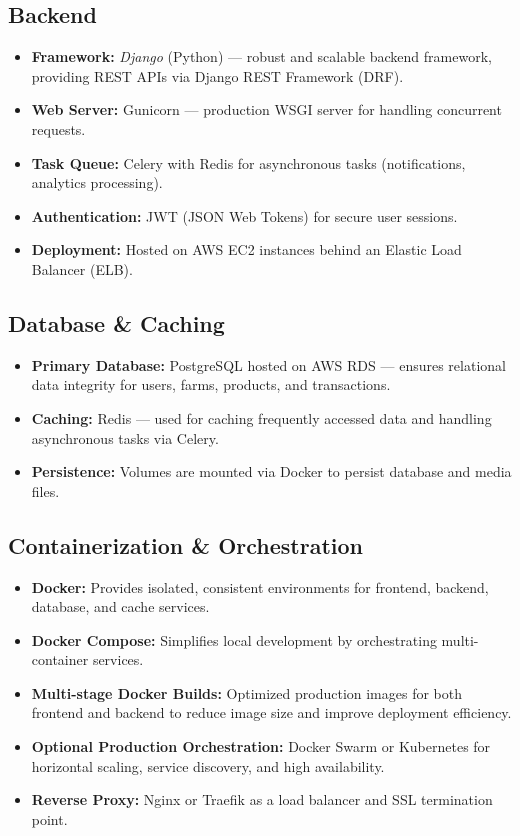 \documentclass[12pt,a4paper]{article}
\begin{document}
\subsection{Backend}
\begin{itemize}
    \item \textbf{Framework:} \textit{Django} (Python) — robust and scalable backend framework, providing REST APIs via Django REST Framework (DRF).
    \item \textbf{Web Server:} Gunicorn — production WSGI server for handling concurrent requests.
    \item \textbf{Task Queue:} Celery with Redis for asynchronous tasks (notifications, analytics processing).
    \item \textbf{Authentication:} JWT (JSON Web Tokens) for secure user sessions.
    \item \textbf{Deployment:} Hosted on AWS EC2 instances behind an Elastic Load Balancer (ELB).
\end{itemize}

\subsection{Database \& Caching}
\begin{itemize}
    \item \textbf{Primary Database:} PostgreSQL hosted on AWS RDS — ensures relational data integrity for users, farms, products, and transactions.
    \item \textbf{Caching:} Redis — used for caching frequently accessed data and handling asynchronous tasks via Celery.
    \item \textbf{Persistence:} Volumes are mounted via Docker to persist database and media files.
\end{itemize}

\subsection{Containerization \& Orchestration}
\begin{itemize}
    \item \textbf{Docker:} Provides isolated, consistent environments for frontend, backend, database, and cache services.
    \item \textbf{Docker Compose:} Simplifies local development by orchestrating multi-container services.
    \item \textbf{Multi-stage Docker Builds:} Optimized production images for both frontend and backend to reduce image size and improve deployment efficiency.
    \item \textbf{Optional Production Orchestration:} Docker Swarm or Kubernetes for horizontal scaling, service discovery, and high availability.
    \item \textbf{Reverse Proxy:} Nginx or Traefik as a load balancer and SSL termination point.
\end{itemize}
\end{document}
